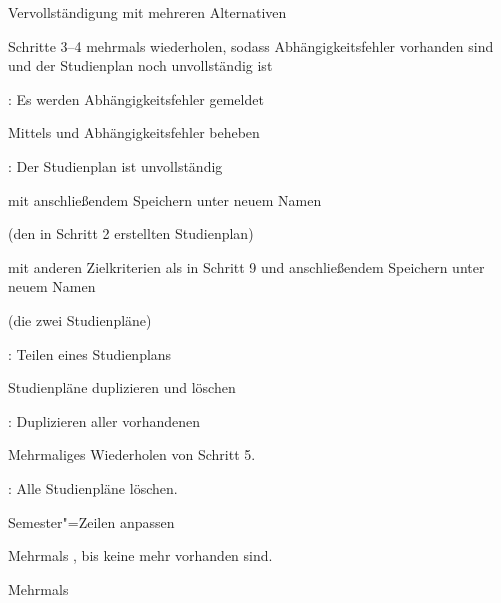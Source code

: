 \begin{scenario}{Vervollständigung mit mehreren Alternativen}
	\item {}
	\item {}
	\item {}
	\item {}
	\item Schritte 3–4 mehrmals wiederholen, sodass Abhängigkeitsfehler vorhanden sind und der \gls{Studienplan} noch unvollständig ist
	\item {}: Es werden Abhängigkeitsfehler gemeldet
	\item Mittels  und  Abhängigkeitsfehler beheben
	\item {}: Der Studienplan ist unvollständig
	\item {} mit anschließendem Speichern unter neuem Namen
	\item {}
	\item {} (den in Schritt 2 erstellten Studienplan)
	\item {} mit anderen Zielkriterien als in Schritt 9 und anschließendem Speichern unter neuem Namen
	\item {}
	\item {} (die zwei  Studienpläne)
	\item {}
	\item {}: Teilen eines Studienplans
\end{scenario}

\begin{scenario}{Studienpläne duplizieren und löschen}
	\item {}
	\item {}
	\item {}
	\item {}
	\item {}: Duplizieren aller vorhandenen 
	\item Mehrmaliges Wiederholen von Schritt 5.
	\item {}: Alle Studienpläne löschen.
\end{scenario}

\begin{scenario}{Semester"=Zeilen anpassen}
	\item {}
	\item {}
	\item Mehrmals , bis keine mehr vorhanden sind.
	\item Mehrmals 
	\item {}
\end{scenario}


